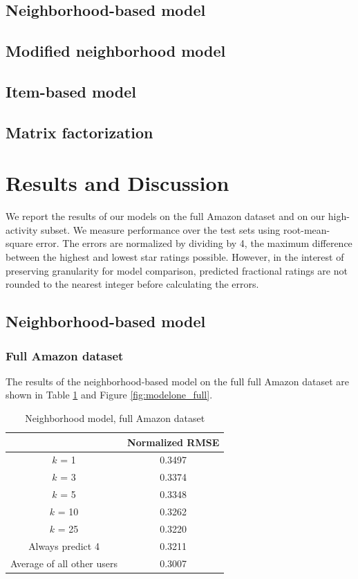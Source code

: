 \documentclass[letterpaper, 10 pt, conference]{ieeeconf}
\begin{document}
\subsection{Neighborhood-based model}
\subsection{Modified neighborhood model}
\subsection{Item-based model}
\subsection{Matrix factorization}

\section{Results and Discussion}
\label{sec:results}

We report the results of our models on the full Amazon dataset and on our 
high-activity subset. We measure performance over the test sets using 
root-mean-square error. The errors are normalized by dividing by 4, the maximum 
difference between the highest and lowest star ratings possible. However, 
in the interest of preserving granularity for model comparison, predicted
fractional ratings are not rounded to the nearest integer before calculating 
the errors. 

\subsection{Neighborhood-based model}
\subsubsection{Full Amazon dataset}
The results of the neighborhood-based model on the full full Amazon dataset 
are shown in Table \ref{table:modelone_full} and Figure \ref{fig:modelone_full}.

\begin{table}[htb]
\centering
\begin{tabular}{|c|c|}
\cline{2-2}

\multicolumn{1}{c|}{}  & {Normalized RMSE} \tabularnewline \hline
$k$ = 1 & 0.3497  \tabularnewline
$k$ = 3 &  0.3374 \tabularnewline
$k$ = 5 & 0.3348  \tabularnewline
$k$ = 10 & 0.3262  \tabularnewline
$k$ = 25  & 0.3220  \tabularnewline
\hline
Always predict 4 & 0.3211 \tabularnewline 
Average of all other users & 0.3007 \tabularnewline

\hline
\end{tabular}
\caption{Neighborhood model, full Amazon dataset}
\label{table:modelone_full}
\end{table}
\end{document}
